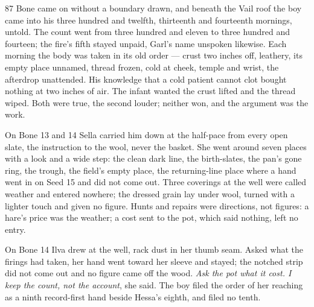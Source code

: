 
\scenebreak


\scenebreak


\scenebreak

\CRtailpiece
\begin{CRchronicle}{87}
Bone came on without a boundary drawn, and beneath the Vail roof the boy came into his three hundred and twelfth, thirteenth and fourteenth mornings, untold. The count went from three hundred and eleven to three hundred and fourteen; the fire’s fifth stayed unpaid, Garl’s name unspoken likewise. Each morning the body was taken in its old order --- crust two inches off, leathery, its empty place unnamed, thread frozen, cold at cheek, temple and wrist, the afterdrop unattended. His knowledge that a cold patient cannot clot bought nothing at two inches of air. The infant wanted the crust lifted and the thread wiped. Both were true, the second louder; neither won, and the argument was the work.

On Bone 13 and 14 Sella carried him down at the half-pace from every open slate, the instruction to the wool, never the basket. She went around seven places with a look and a wide step: the clean dark line, the birth-slates, the pan’s gone ring, the trough, the field’s empty place, the returning-line place where a hand went in on Seed 15 and did not come out. Three coverings at the well were called weather and entered nowhere; the dressed grain lay under wool, turned with a lighter touch and given no figure. Hunts and repairs were directions, not figures: a hare’s price was the weather; a cost sent to the pot, which said nothing, left no entry.

On Bone 14 Ilva drew at the well, rack dust in her thumb seam. Asked what the firings had taken, her hand went toward her sleeve and stayed; the notched strip did not come out and no figure came off the wood. \emph{Ask the pot what it cost. I keep the count, not the account}, she said. The boy filed the order of her reaching as a ninth record-first hand beside Hessa’s eighth, and filed no tenth.


\end{CRchronicle}
